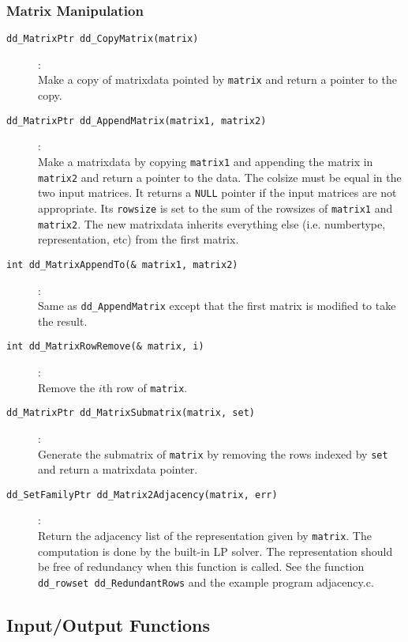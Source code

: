 \documentclass[11pt]{article}
\newcommand {\0} {{\bf 0}}
\begin{document}
\subsubsection{Matrix Manipulation}
\begin{description}

\item[{\tt dd\_MatrixPtr dd\_CopyMatrix(matrix)}]:\\
Make a copy of matrixdata pointed by {\tt matrix} and return
a pointer to the copy.

\item[{\tt dd\_MatrixPtr dd\_AppendMatrix(matrix1, matrix2)}]:\\
Make a matrixdata by copying {\tt *matrix1} and appending
the matrix in {\tt *matrix2} and return
a pointer to the data.  The colsize must be equal in
the two input matrices.  It returns a {\tt NULL} pointer
if the input matrices are not appropriate.
Its {\tt rowsize} is set to
the sum of the rowsizes of {\tt matrix1} and {\tt matrix2}.
 The new matrixdata inherits everything else
(i.e. numbertype, representation, etc)
from the first matrix. 

\item[{\tt int dd\_MatrixAppendTo(\& matrix1, matrix2)}]:\\
Same as {\tt dd\_AppendMatrix} except that the first matrix
is modified to take the result.

\item[{\tt int dd\_MatrixRowRemove(\& matrix, i)}]:\\
Remove the $i$th row of {\tt matrix}.

\item[{\tt dd\_MatrixPtr dd\_MatrixSubmatrix(matrix, set)}]:\\
Generate the submatrix of {\tt matrix} by removing the
rows indexed by {\tt set} and return a matrixdata pointer.

\item[{\tt  dd\_SetFamilyPtr dd\_Matrix2Adjacency(matrix, err)}]:\\
Return the adjacency list of the representation given by {\tt matrix}.
The computation is done by the built-in LP solver.  The representation
should be free of redundancy when this function is called. 
See the function  {\tt dd\_rowset dd\_RedundantRows}
and the example program adjacency.c.

\end{description}

\subsection{Input/Output Functions}  \label{IOLibrary}
\end{document}
